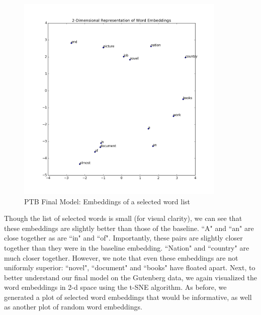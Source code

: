 \documentclass[a4paper]{article}
\begin{document}
\begin{figure}[H]
  \includegraphics[width=10cm]{../plots/PTB_dropout_point3_two_layer_200_hidden_200_embeddding_word_list_embeddings.png}
  \centering
  \caption{PTB Final Model: Embeddings of a selected word list}
  \label{fig:ptb1}
\end{figure}
Though the list of selected words is small (for visual clarity), we can see that these embeddings are slightly better than those of the baseline. ``A" and ``an" are close together as are ``in" and ``of". Importantly, these pairs are slightly closer together than they were in the baseline embedding. ``Nation" and ``country" are much closer together. However, we note that even these embeddings are not uniformly superior: ``novel", ``document" and ``books" have floated apart. 
\newline
\newline
Next, to better understand our final model on the Gutenberg data, we again visualized the word embeddings in 2-d space using the t-SNE algorithm. As before, we generated a plot of selected word embeddings that would be informative, as well as another plot of random word embeddings.
\end{document}

